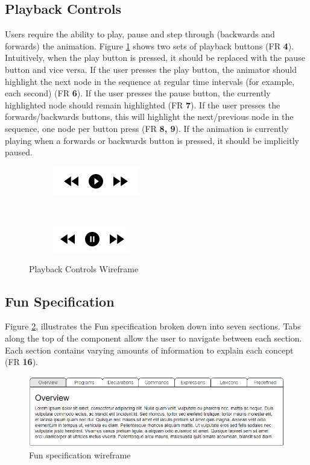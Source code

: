 \documentclass{l4proj}
\begin{document}
\subsection{Playback Controls}
Users require the ability to play, pause and step through (backwards and forwards) the animation. Figure \ref{fig:playback-wireframe} shows two sets of playback buttons (FR \textbf{4}). Intuitively, when the play button is pressed, it should be replaced with the pause button and vice versa. If the user presses the play button, the animator should highlight the next node in the sequence at regular time intervals (for example, each second) (FR \textbf{6}). If the user presses the pause button, the currently highlighted node should remain highlighted (FR \textbf{7}). If the user presses the forwards/backwards buttons, this will highlight the next/previous node in the sequence, one node per button press (FR \textbf{8, 9}). If the animation is currently playing when a forwards or backwards button is pressed, it should be implicitly paused.

\begin{figure}[h]
	\centering
	\begin{subfigure}[b]{0.3\textwidth}
		\includegraphics[]{images/playback-play-wireframe.png}
	\end{subfigure}
	~
	\begin{subfigure}[b]{0.3\textwidth}
		\includegraphics[]{images/playback-pause-wireframe.png}
	\end{subfigure}
	\caption{Playback Controls Wireframe}\label{fig:playback-wireframe}	
\end{figure}

\subsection{Fun Specification}
 Figure \ref{fig:fun-specification-wireframe}, illustrates the Fun specification broken down into seven sections. Tabs along the top of the component allow the user to navigate between each section. Each section contains varying amounts of information to explain each concept (FR \textbf{16}).
 
 \begin{figure}[h]
\centering
\includegraphics[scale=0.6]{images/specification-wireframe.png}
\caption{Fun specification wireframe}
\label{fig:fun-specification-wireframe}	
\end{figure}
\end{document}
